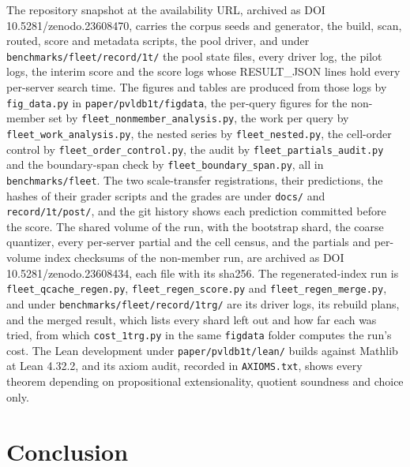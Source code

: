 \documentclass[sigconf, nonacm]{acmart}
\begin{document}
{\sloppy The repository snapshot at the availability URL, archived as DOI 10.5281/zenodo.23608470, carries
the corpus seeds and generator, the build, scan, routed, score and metadata scripts, the pool
driver, and under \texttt{benchmarks/fleet/record/1t/} the pool state files, every driver log, the
pilot logs, the interim score and the score logs whose RESULT\_JSON lines hold every per-server
search time. The figures and tables are produced from those logs by \texttt{fig\_data.py} in
\texttt{paper/pvldb1t/figdata}, the per-query figures for the non-member set by
\texttt{fleet\_nonmember\_analysis.py}, the work per query by \texttt{fleet\_work\_analysis.py},
the nested series by \texttt{fleet\_nested.py}, the cell-order control by
\texttt{fleet\_order\_control.py}, the audit by \texttt{fleet\_partials\_audit.py} and the
boundary-span check by \texttt{fleet\_boundary\_span.py}, all in
\texttt{benchmarks/fleet}. The two scale-transfer registrations, their predictions, the hashes of
their grader scripts and the grades are under \texttt{docs/} and \texttt{record/1t/post/}, and the
git history shows each prediction committed before the score. The shared volume of the run, with the bootstrap shard, the coarse
quantizer, every per-server partial and the cell census, and the partials and per-volume index
checksums of the non-member run, are archived as DOI 10.5281/zenodo.23608434, each file with its
sha256. The regenerated-index run is \texttt{fleet\_qcache\_regen.py}, \texttt{fleet\_regen\_score.py}
and \texttt{fleet\_regen\_merge.py}, and under \texttt{benchmarks/fleet/record/1trg/} are its
driver logs, its rebuild plans, and the merged result, which lists every shard left out and how
far each was tried, from which \texttt{cost\_1trg.py} in the same \texttt{figdata} folder
computes the run's cost. The Lean development under \texttt{paper/pvldb1t/lean/} builds against
Mathlib at Lean 4.32.2, and its axiom audit, recorded in \texttt{AXIOMS.txt}, shows every theorem
depending on propositional extensionality, quotient soundness and choice only.\par}

\section{Conclusion}
\end{document}
